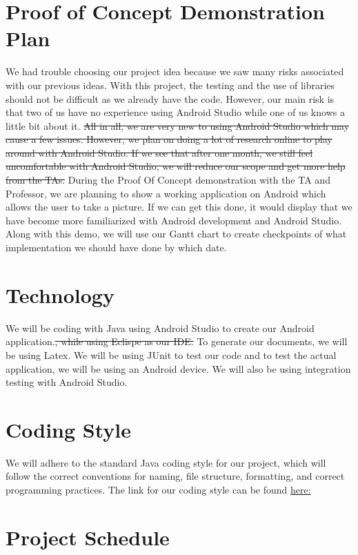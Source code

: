 \documentclass{article}
\begin{document}
\section{Proof of Concept Demonstration Plan}
We had trouble choosing our project idea because we saw many risks associated with our previous ideas. With this project, the testing and the use of libraries should not be difficult as we already have the code. However, our main risk is that two of us have no experience using Android Studio while one of us knows a little bit about it. \sout{All in all, we are very new to using Android Studio which may cause a few issues. However, we plan on doing a lot of research online to play around with Android Studio. If we see that after one month, we still feel uncomfortable with Android Studio, we will reduce our scope and get more help from the TAs.} {\color{red} During the Proof Of Concept demonstration with the TA and Professor, we are planning to show a working application on Android which allows the user to take a picture. If we can get this done, it would display that we have become more familiarized with Android development and Android Studio. Along with this demo, we will use our Gantt chart to create checkpoints of what implementation we should have done by which date.}

\section{Technology}
We will be coding with Java using Android Studio to create our Android application.\sout{, while using Eclispe as our IDE.} To generate our documents, we will be using Latex. We will be using JUnit to test our code and to test the actual application, we will be using an Android device. We will also be using integration testing with Android Studio.

\section{Coding Style}
We will adhere to the standard Java coding style for our project, which will follow the correct conventions for naming, file structure, formatting, and correct programming practices. {\color{red} {The link for our coding style can be found \href{http://www.oracle.com/technetwork/java/codeconvtoc-136057.html}{here:}}}

\section{Project Schedule}
\end{document}
